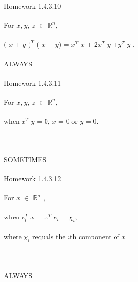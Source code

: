 \documentclass[11pt]{article}
\begin{document}
\newline
Homework 1.4.3.10
\\
\\
For $x$, $y$, $z$ $\in$ $\mathbb{R}^n$,
\\
\\
$($ $x$ + $y$ $)^{T}$ ( $x$ + $y$) = $x^{T}$ $x$ + 2$x^{T}$ $y$ +$y^{T}$ $y$ .
\\
\\
ALWAYS
\\
\\
\newline
Homework 1.4.3.11
\\
\\
For $x$, $y$, $z$ $\in$ $\mathbb{R}^n$,
\\
\\
when $x^{T}$ $y$ = 0, $x$ = 0 or $y$ = 0.
\\
\\
\\
\\
SOMETIMES
\\
\\
\newline
Homework 1.4.3.12
\\
\\
For $x$ $\in$ $\mathbb{R}^n$ ,
\\
\\
when $e_{i}^{T}$ $x$ =  $x^{T}$ $e_{i}$ = $\chi_{i}$,
\\
\\
where $\chi_{i}$ requals the $i$th component of $x$
\\
\\
\\
\\
ALWAYS
\\
\\
\newline
\end{document}
